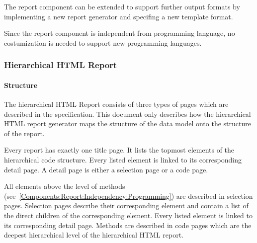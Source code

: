 The report component can be extended to support further output formats by implementing a new report generator and specifing a new template format.

Since the report component is independent from programming language, no costumization is needed to support new programming languages.

\subsubsection{Hierarchical HTML Report} \label{Components:Report:HTML}


\paragraph{Structure}

The hierarchical HTML Report consists of three types of pages which are described in the specification. This document only describes how the hierarchical HTML report generator maps the structure of the data model onto the structure of the report.

Every report has exactly one title page. It lists the topmost elements of the hierarchical code structure. Every listed element is linked to its corresponding detail page. A detail page is either a selection page or a code page.

All elements above the level of methods (see~\ref{Components:Report:Independency:Programming}) are described in selection pages. Selection pages describe their corresponding element and contain a list of the direct children of the corresponding element. Every listed element is linked to its corresponding detail page. Methods are described in code pages which are the deepest hierarchical level of the hierarchical HTML report.

